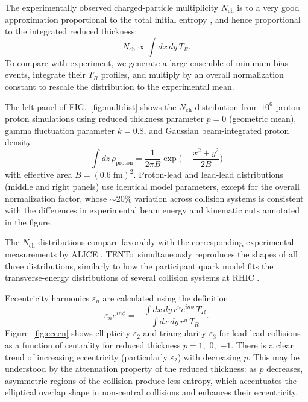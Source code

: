 \documentclass[aps,prc,reprint,amsmath,nofootinbib]{revtex4-1}
\newcommand{\trento}{T\raisebox{-.5ex}{R}ENTo}
\newcommand{\nch}{N_\text{ch}}
\begin{document}

The experimentally observed charged-particle multiplicity $\nch$ is to a very good approximation proportional to the total initial entropy \cite{}, and hence proportional to the integrated reduced thickness:
\begin{equation}
  \nch \propto \int dx \, dy \, T_R.
\end{equation}
To compare with experiment, we generate a large ensemble of minimum-bias events, integrate their $T_R$ profiles, and multiply by an overall normalization constant to rescale the distribution to the experimental mean.

The left panel of FIG.~\ref{fig:multdist} shows the $\nch$ distribution from $10^6$ proton-proton simulations
using reduced thickness parameter $p = 0$ (geometric mean), gamma fluctuation parameter $k = 0.8$, and
Gaussian beam-integrated proton density
\begin{equation}
  \int dz \, \rho_\text{proton} = \frac{1}{2\pi B} \exp\biggr( -\frac{x^2 + y^2}{2B} \biggr)
\end{equation}
with effective area $B = (0.6\;\text{fm})^2$.
Proton-lead and lead-lead distributions (middle and right panels) use identical model parameters, except for the overall normalization factor, whose $\sim$20\% variation across collision systems is consistent with the differences in experimental beam energy and kinematic cuts annotated in the figure.

The $\nch$ distributions compare favorably with the corresponding experimental measurements by ALICE \cite{}.
\trento\ simultaneously reproduces the shapes of all three distributions, similarly to how the participant quark model fits the transverse-energy distributions of several collision systems at RHIC \cite{Adler:2013aqf}.


Eccentricity harmonics $\varepsilon_n$ are calculated using the definition
\begin{equation}
  \varepsilon_n e^{i n\phi} = -\frac{\int dx \, dy\, r^n e^{i n \phi} \, T_R}{\int dx \, dy \, r^n \, T_R}.
\end{equation}
Figure~\ref{fig:eccen} shows ellipticity $\varepsilon_2$ and triangularity $\varepsilon_3$ for lead-lead collisions as a function of centrality for reduced thickness $p = 1$,~0,~$-1$.  There is a clear trend of increasing eccentricity
(particularly $\varepsilon_2$) with decreasing $p$.  This may be understood by the attenuation property of the
reduced thickness:  as $p$ decreases, asymmetric regions of the collision produce less entropy, which
accentuates the elliptical overlap shape in non-central collisions and enhances their eccentricity.
\end{document}
